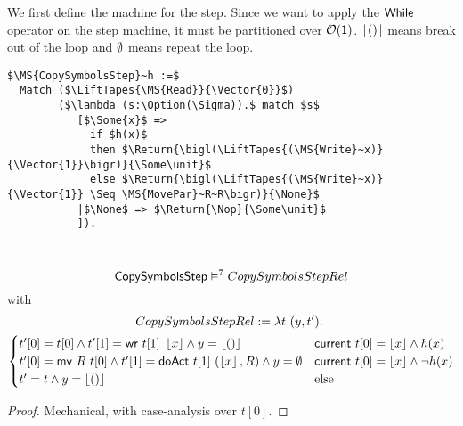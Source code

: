 We first define the machine for the step.  Since we want to apply the $\mathsf{While}$ operator on the step machine, it must be partitioned over
$\mathcal{O}(\mathsf{1})$.  $\left\lfloor {\ensuremath{\mathsf{()}}} \right\rfloor$ means break out of the loop and $\emptyset$ means repeat the loop.
\begin{definition}[$\MS{CopySymbolsStep}$]
  \label{CopySymbols_Step}
\begin{lstlisting}[style=semicoqstyle]
$\MS{CopySymbolsStep}~h :=$
  Match ($\LiftTapes{\MS{Read}}{\Vector{0}}$)
        ($\lambda (s:\Option(\Sigma)).$ match $s$
           [$\Some{x}$ =>
             if $h(x)$
             then $\Return{\bigl(\LiftTapes{(\MS{Write}~x)}{\Vector{1}}\bigr)}{\Some\unit}$ 
             else $\Return{\bigl(\LiftTapes{(\MS{Write}~x)}{\Vector{1}} \Seq \MS{MovePar}~R~R\bigr)}{\None}$ 
           |$\None$ => $\Return{\Nop}{\Some\unit}$ 
           ]).
\end{lstlisting}
\end{definition}

\begin{lemma}
  \label{lem:CopySymbols_Step_Sem}
  ~
  \[
    \mathsf{CopySymbolsStep} \vDash^7 CopySymbolsStepRel
  \]
  with
  \begin{multline*}
    CopySymbolsStepRel := \lambda t~(y, t').~\\
    \begin{cases}
      t'[0] = t[0]           \land t'[1]=\mathsf{wr}~t[1]~\left\lfloor {x} \right\rfloor         \land y=\left\lfloor {\ensuremath{\mathsf{()}}} \right\rfloor & \mathsf{current}~t[0]=\left\lfloor {x} \right\rfloor \land       h(x) \\
      t'[0] = \mathsf{mv}~R~t[0] \land t'[1]=\mathsf{doAct}~t[1]~(\left\lfloor {x} \right\rfloor, R) \land y=\emptyset      & \mathsf{current}~t[0]=\left\lfloor {x} \right\rfloor \land \lnot h(x) \\
      t' = t \land y=\left\lfloor {\ensuremath{\mathsf{()}}} \right\rfloor                                                           & \text{else}
    \end{cases}
  \end{multline*}
\end{lemma}
\begin{proof}
  Mechanical, with case-analysis over $t[0]$.
\end{proof}

